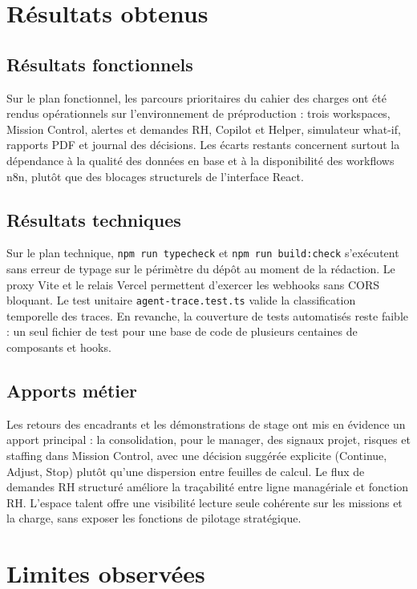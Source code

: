 \section{Résultats obtenus}

\subsection{Résultats fonctionnels}

Sur le plan fonctionnel, les parcours prioritaires du cahier des charges ont été rendus opérationnels sur l'environnement de préproduction : trois workspaces, Mission Control, alertes et demandes RH, Copilot et Helper, simulateur what-if, rapports PDF et journal des décisions. Les écarts restants concernent surtout la dépendance à la qualité des données en base et à la disponibilité des workflows n8n, plutôt que des blocages structurels de l'interface React.

\subsection{Résultats techniques}

Sur le plan technique, \texttt{npm run typecheck} et \texttt{npm run build:check} s'exécutent sans erreur de typage sur le périmètre du dépôt au moment de la rédaction. Le proxy Vite et le relais Vercel permettent d'exercer les webhooks sans CORS bloquant. Le test unitaire \texttt{agent-trace.test.ts} valide la classification temporelle des traces. En revanche, la couverture de tests automatisés reste faible : un seul fichier de test pour une base de code de plusieurs centaines de composants et hooks.

\subsection{Apports métier}

Les retours des encadrants et les démonstrations de stage ont mis en évidence un apport principal : la consolidation, pour le manager, des signaux projet, risques et staffing dans Mission Control, avec une décision suggérée explicite (Continue, Adjust, Stop) plutôt qu'une dispersion entre feuilles de calcul. Le flux de demandes RH structuré améliore la traçabilité entre ligne managériale et fonction RH. L'espace talent offre une visibilité lecture seule cohérente sur les missions et la charge, sans exposer les fonctions de pilotage stratégique.

\section{Limites observées}

